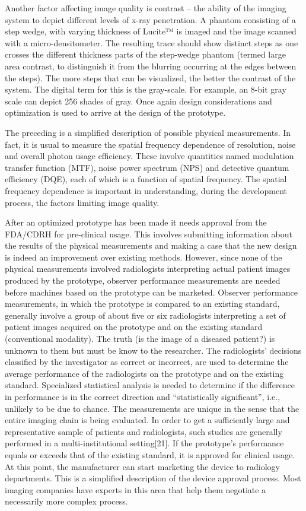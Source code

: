 \documentclass[
]{book}
\begin{document}
Another factor affecting image quality is contrast -- the ability of the imaging system to depict different levels of x-ray penetration. A phantom consisting of a step wedge, with varying thickness of Lucite™ is imaged and the image scanned with a micro-densitometer. The resulting trace should show distinct steps as one crosses the different thickness parts of the step-wedge phantom (termed large area contrast, to distinguish it from the blurring occurring at the edges between the steps). The more steps that can be visualized, the better the contrast of the system. The digital term for this is the gray-scale. For example, an 8-bit gray scale can depict 256 shades of gray. Once again design considerations and optimization is used to arrive at the design of the prototype.

The preceding is a simplified description of possible physical measurements. In fact, it is usual to measure the spatial frequency dependence of resolution, noise and overall photon usage efficiency. These involve quantities named modulation transfer function (MTF), noise power spectrum (NPS) and detective quantum efficiency (DQE), each of which is a function of spatial frequency. The spatial frequency dependence is important in understanding, during the development process, the factors limiting image quality.

After an optimized prototype has been made it needs approval from the FDA/CDRH for pre-clinical usage. This involves submitting information about the results of the physical measurements and making a case that the new design is indeed an improvement over existing methods. However, since none of the physical measurements involved radiologists interpreting actual patient images produced by the prototype, observer performance measurements are needed before machines based on the prototype can be marketed. Observer performance measurements, in which the prototype is compared to an existing standard, generally involve a group of about five or six radiologists interpreting a set of patient images acquired on the prototype and on the existing standard (conventional modality). The truth (is the image of a diseased patient?) is unknown to them but must be know to the researcher. The radiologists' decisions classified by the investigator as correct or incorrect, are used to determine the average performance of the radiologists on the prototype and on the existing standard. Specialized statistical analysis is needed to determine if the difference in performance is in the correct direction and ``statistically significant'', i.e., unlikely to be due to chance. The measurements are unique in the sense that the entire imaging chain is being evaluated. In order to get a sufficiently large and representative sample of patients and radiologists, such studies are generally performed in a multi-institutional setting{[}21{]}. If the prototype's performance equals or exceeds that of the existing standard, it is approved for clinical usage. At this point, the manufacturer can start marketing the device to radiology departments. This is a simplified description of the device approval process. Most imaging companies have experts in this area that help them negotiate a necessarily more complex process.
\end{document}
